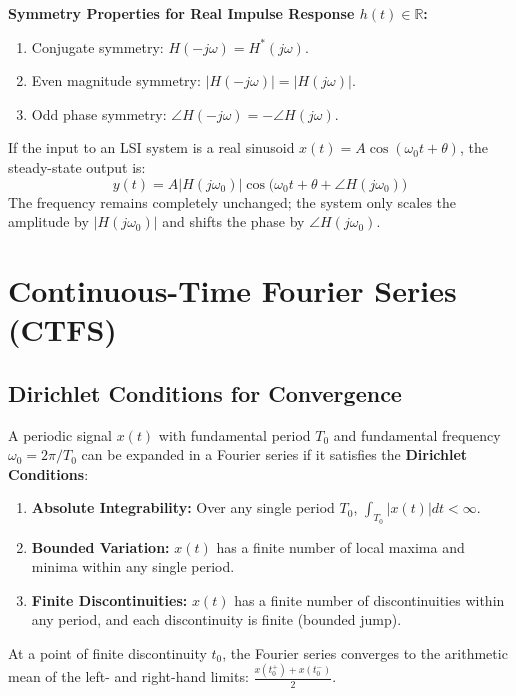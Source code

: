 \documentclass[12pt,a4paper]{article}
\begin{document}
\textbf{Symmetry Properties for Real Impulse Response $h(t) \in \mathbb{R}$:}
\begin{enumerate}[topsep=2pt, itemsep=2pt]
  \item Conjugate symmetry: $H(-j\omega) = H^*(j\omega)$.
  \item Even magnitude symmetry: $|H(-j\omega)| = |H(j\omega)|$.
  \item Odd phase symmetry: $\angle H(-j\omega) = -\angle H(j\omega)$.
\end{enumerate}

\begin{tcolorbox}[examplebox, title={\textbf{Sinusoidal Steady-State Response}}]
If the input to an LSI system is a real sinusoid $x(t) = A \cos(\omega_0 t + \theta)$, the steady-state output is:
\begin{equation}
  y(t) = A |H(j\omega_0)| \cos\big(\omega_0 t + \theta + \angle H(j\omega_0)\big)
\end{equation}
The frequency remains completely unchanged; the system only scales the amplitude by $|H(j\omega_0)|$ and shifts the phase by $\angle H(j\omega_0)$.
\end{tcolorbox}

\section{Continuous-Time Fourier Series (CTFS)}

\subsection{Dirichlet Conditions for Convergence}
A periodic signal $x(t)$ with fundamental period $T_0$ and fundamental frequency $\omega_0 = 2\pi / T_0$ can be expanded in a Fourier series if it satisfies the \textbf{Dirichlet Conditions}:
\begin{enumerate}[topsep=2pt, itemsep=2pt]
  \item \textbf{Absolute Integrability:} Over any single period $T_0$, $\int_{T_0} |x(t)| dt < \infty$.
  \item \textbf{Bounded Variation:} $x(t)$ has a finite number of local maxima and minima within any single period.
  \item \textbf{Finite Discontinuities:} $x(t)$ has a finite number of discontinuities within any period, and each discontinuity is finite (bounded jump).
\end{enumerate}
At a point of finite discontinuity $t_0$, the Fourier series converges to the arithmetic mean of the left- and right-hand limits: $\frac{x(t_0^+) + x(t_0^-)}{2}$.
\end{document}
